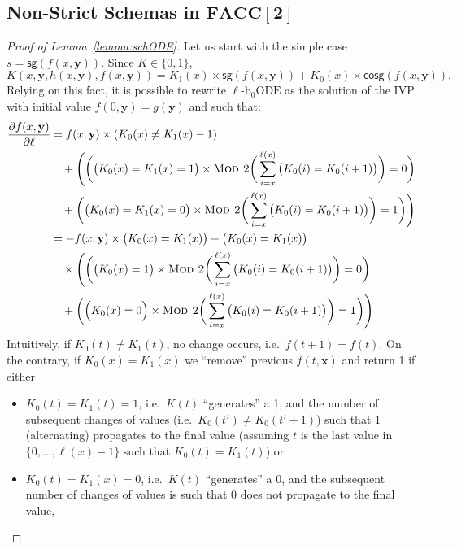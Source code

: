 \documentclass[11pt, oneside]{article}
\newcommand{\fun}[1]{\mathsf{#1}}
\newcommand{\FACC}{\mathbf{FACC[2]}}
\newcommand{\tu}[1]{\mathbf{#1}}
\theoremstyle{definition}
\newcommand{\schODE}{\ell\text{-b}_0\text{ODE}}
\begin{document}
\begin{toappendix}
\subsection{Non-Strict Schemas in $\FACC$}\label{appendix:FACC}

\begin{proof}[Proof of Lemma~\ref{lemma:schODE}]
    Let us start with the simple case $s=\fun{sg}(f(x, \tu y))$.
    Since $K\in \{0,1\}$,
    $$
    K(x, \tu y, h(x, \tu y), f(x, \tu y)) = K_1(x) \times \fun{sg}(f(x,\tu y)) + K_0(x) \times \fun{cosg}(f(x, \tu y)).
    $$
    Relying on this fact, it is possible to rewrite $\schODE$ as the solution of the IVP with initial value $f(0, \tu y)=g(\tu y)$ and such that:
    \small
    \begin{align*}
        \frac{\partial f(x, \tu y)}{\partial \ell} &= f(x, \tu y) \times (K_0(x) \neq K_1(x) -1) \\
        &\quad + \Bigg(\bigg(\big(K_0(x) = K_1(x) = 1\big) \times \textsc{Mod 2}\bigg(\sum^{\ell(x)}_{i=x}\big(K_0(i) = K_0(i+1)\big)\bigg) = 0\bigg) \\
        &\quad + \bigg(\big(K_0(x) = K_1(x) = 0 \big) \times \textsc{Mod 2} \bigg(\sum^{\ell(x)}_{i=x}\big(K_0(i) = K_0(i+1)\big)\bigg)=1\bigg)\Bigg) \\
        &= -f(x, \tu y) \times \big(K_0(x) = K_1(x)\big) + \big(K_0(x) = K_1(x)\big) \\
        &\quad \times \Bigg(\bigg(\big(K_0(x) = 1 \big) \times \textsc{Mod 2}\bigg(\sum^{\ell(x)}_{i=x} \big(K_0(i) = K_0(i+1)\big)\bigg) = 0\bigg) \\
        & \quad + \bigg(\Big(K_0(x) = 0\Big) \times \textsc{Mod 2}\bigg(\sum^{\ell(x)}_{i=x}\big(K_0(i) = K_0(i+1)\big)\bigg) =1 \bigg)\Bigg)
    \end{align*}
    \normalsize
    Intuitively, if $K_0(t) \neq K_1(t)$, no change occurs, i.e.~$f(t+1)=f(t)$.
    On the contrary, if $K_0(x)=K_1(x)$ we ``remove'' previous $f(t,\tu x)$ and return 1 if either
    \begin{itemize}
        \itemsep0em
        \item $K_0(t)=K_1(t)=1$, i.e.~$K(t)$ ``generates'' a 1, and the number of subsequent changes of values (i.e.~$K_0(t') \neq K_0(t'+1)$) such that 1 (alternating) propagates to the final value (assuming $t$ is the last value in $\{0,\dots, \ell(x)-1\}$ such that $K_0(t)=K_1(t)$) or
        \item $K_0(t)=K_1(x)=0$, i.e.~$K(t)$ ``generates'' a 0, and the subsequent number of changes of values is such that 0 does not propagate to the final value,

\end{itemize}
\end{proof}
\end{toappendix}
\end{document}
